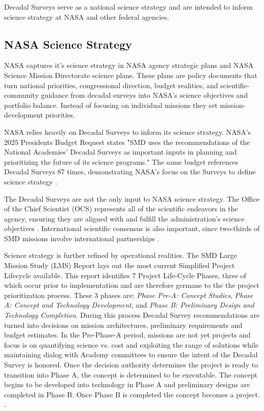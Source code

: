 \documentclass[preprint,12pt,doubleblind]{elsarticle}
\begin{document}
Decadal Surveys serve as a national science strategy and are intended to inform science strategy at NASA and other federal agencies. 

\subsection{NASA Science Strategy}
NASA captures it's science strategy in NASA agency strategic plans and NASA Science Mission Directorate science plans. These plans are policy documents that turn national priorities, congressional direction, budget realities, and scientific-community guidance from decadal surveys into NASA's science objectives and portfolio balance. Instead of focusing on individual missions they set mission-development priorities. 

NASA relies heavily on Decadal Surveys to inform its science strategy. NASA's 2025 Presidents Budget Request states "SMD uses the recommendations of the National Academies' Decadal Surveys as important inputs in planning and prioritizing the future of its science programs." The same budget references Decadal Surveys 87 times, demonstrating NASA's focus on the Surveys to define science strategy \cite{NASA2025budget}. 

The Decadal Surveys are not the only input to NASA science strategy. The Office of the Chief Scientist (OCS) represents all of the scientific endeavors in the agency, ensuring they are aligned with and fulfill the administration's science objectives \cite{nasa_partnerships_2024}. International scientific consensus is also important, since two-thirds of SMD missions involve international partnerships \cite{nasa_smd_hearing_2024}. 
 
Science strategy is further refined by operational realities. The SMD Large Mission Study (LMS) Report lays out the most current Simplified Project Lifecycle available. This report identifies 7 Project Life-Cycle Phases, three of which occur prior to implementation and are therefore germane to the the project prioritization process. These 3 phases are: \emph{Phase Pre-A: Concept Studies}, \emph{Phase A: Concept and Technology Development}, and \emph{Phase B: Preliminary Design and Technology Completion}. During this process Decadal Survey recommendations are turned into decisions on mission architectures, preliminary requirements and budget estimates. In the Pre-Phase-A period, missions are not yet projects and focus is on quantifying science vs. cost and exploiting the range of solutions while maintaining dialog with Academy committees to ensure the intent of the Decadal Survey is honored. Once the decision authority determines the project is ready to transition into Phase A, the concept is determined to be executable. The concept begins to be developed into technology in Phase A and preliminary designs are completed in Phase B. Once Phase B is completed the concept becomes a project. \cite{NASA2020_LMS_study} \cite{wessen2013ConceptMaturity}.
\end{document}
